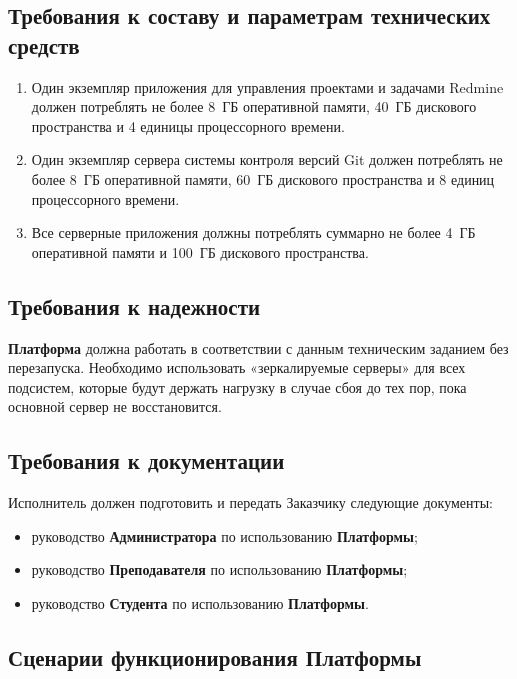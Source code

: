 \subsection*{Требования к составу и параметрам технических средств}

\begin{enumerate}
	\item Один экземпляр приложения для управления проектами и задачами Redmine должен потреблять не более 8~ГБ оперативной памяти, 40~ГБ дискового пространства и 4 единицы процессорного времени.
	\item Один экземпляр сервера системы контроля версий Git должен потреблять не более 8~ГБ оперативной памяти, 60~ГБ дискового пространства и 8 единиц процессорного времени.
	\item Все серверные приложения должны потреблять суммарно не более 4~ГБ оперативной памяти и 100~ГБ дискового пространства.
\end{enumerate}

\subsection*{Требования к надежности}

\textbf{Платформа} должна работать в соответствии с данным техническим заданием без перезапуска. Необходимо использовать «зеркалируемые серверы» для всех подсистем, которые будут держать нагрузку в случае сбоя до тех пор, пока основной сервер не восстановится.

\subsection*{Требования к документации}


Исполнитель должен подготовить и передать Заказчику следующие документы:

\begin{itemize} 
	\item руководство \textbf{Администратора} по использованию \textbf{Платформы};
	\item руководство \textbf{Преподавателя} по использованию \textbf{Платформы};
	\item руководство \textbf{Студента} по использованию \textbf{Платформы}.
\end{itemize}


\subsection*{Сценарии функционирования Платформы}

